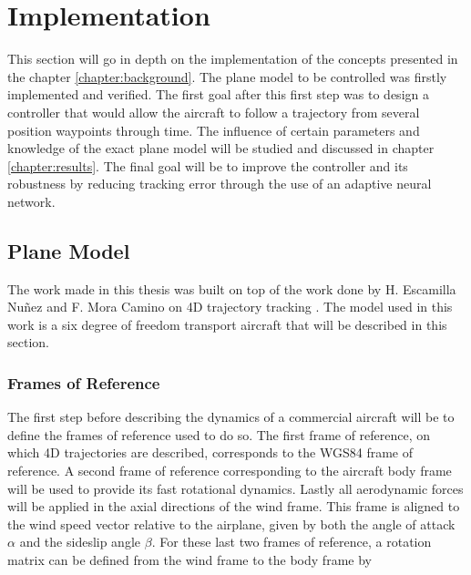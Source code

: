 
\chapter{Implementation}
\label{chapter:implementation}

This section will go in depth on the implementation of the concepts presented in the chapter \ref{chapter:background}. The plane model to be controlled was firstly implemented and verified. The first goal after this first step was to design a controller that would allow the aircraft to follow a trajectory from several position waypoints through time. The influence of certain parameters and knowledge of the exact plane model will be studied and discussed in chapter \ref{chapter:results}. The final goal will be to improve the controller and its robustness by reducing tracking error through the use of an adaptive neural network.

\section{Plane Model}
\label{section:model}
The work made in this thesis was built on top of the work done by H. Escamilla Nuñez and  F. Mora Camino on 4D trajectory tracking \cite{hector}. The model used in this work is a six degree of freedom transport aircraft that will be described in this section. 

\subsection{Frames of Reference}
\label{section:background/model/for}
The first step before describing the dynamics of a commercial aircraft will be to define the frames of reference used to do so. The first frame of reference, on which 4D trajectories are described, corresponds to the WGS84 frame of reference. A second frame of reference corresponding to the aircraft body frame will be used to provide its fast rotational dynamics. Lastly all aerodynamic forces will be applied in the axial directions of the wind frame. This frame is aligned to the wind speed vector relative to the airplane, given by both the angle of attack $\alpha$ and the sideslip angle $\beta$. For these last two frames of reference, a rotation matrix can be defined from the wind frame to the body frame by



